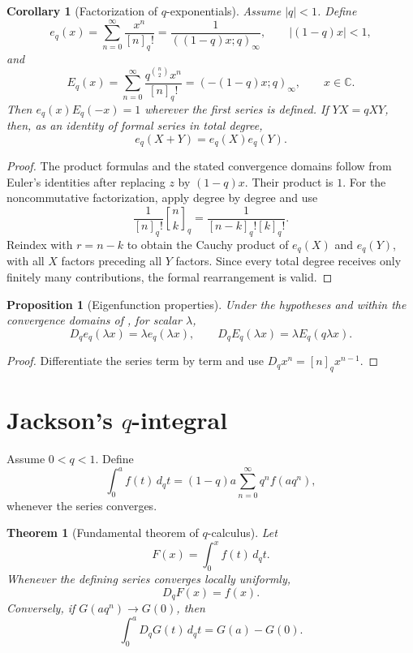 \documentclass[11pt,oneside,openany]{book}
\newtheorem{theorem}{Theorem}[chapter]
\newtheorem{proposition}[proposition]{Proposition}
\newtheorem{corollary}[corollary]{Corollary}
\theoremstyle{definition}
\theoremstyle{remark}
\newcommand{\qbinom}[2]{\genfrac{[}{]}{0pt}{}{#1}{#2}_{q}}
\newcommand{\C}{\mathbb C}
\newcommand{\abs}[1]{\lvert #1\rvert}
\begin{document}
\begin{corollary}[Factorization of $q$-exponentials]\label{cor:qexp-factor}
Assume $\abs q<1$.  Define
\[
 e_q(x)=\sum_{n=0}^{\infty}\frac{x^n}{[n]_q!}
 =\frac1{((1-q)x;q)_\infty},
 \qquad \abs{(1-q)x}<1,
\]
and
\[
 E_q(x)=\sum_{n=0}^{\infty}\frac{q^{\binom n2}x^n}{[n]_q!}
 =(-(1-q)x;q)_\infty,
 \qquad x\in\C.
\]
Then $e_q(x)E_q(-x)=1$ wherever the first series is defined.  If $YX=qXY$, then, as an identity of formal series in total degree,
\[
 e_q(X+Y)=e_q(X)e_q(Y).
\]
\end{corollary}

\begin{proof}
The product formulas and the stated convergence domains follow from Euler's identities after replacing $z$ by $(1-q)x$.  Their product is $1$.  For the noncommutative factorization, apply  degree by degree and use
\[
 \frac1{[n]_q!}\qbinom nk
 =\frac1{[n-k]_q![k]_q!}.
\]
Reindex with $r=n-k$ to obtain the Cauchy product of $e_q(X)$ and $e_q(Y)$, with all $X$ factors preceding all $Y$ factors.  Since every total degree receives only finitely many contributions, the formal rearrangement is valid.
\end{proof}

\begin{proposition}[Eigenfunction properties]\label{prop:qexp-eigen}
Under the hypotheses and within the convergence domains of , for scalar $\lambda$,
\[
 D_qe_q(\lambda x)=\lambda e_q(\lambda x),
 \qquad
 D_qE_q(\lambda x)=\lambda E_q(q\lambda x).
\]
\end{proposition}

\begin{proof}
Differentiate the series term by term and use $D_qx^n=[n]_qx^{n-1}$.
\end{proof}

\section{Jackson's \texorpdfstring{$q$}{q}-integral}

Assume $0<q<1$.  Define
\[
 \int_0^a f(t)\,d_qt
 =(1-q)a\sum_{n=0}^{\infty}q^nf(aq^n),
\]
whenever the series converges.

\begin{theorem}[Fundamental theorem of $q$-calculus]\label{thm:q-fundamental}
Let
\[
 F(x)=\int_0^x f(t)\,d_qt.
\]
Whenever the defining series converges locally uniformly,
\[
 D_qF(x)=f(x).
\]
Conversely, if $G(aq^n)\to G(0)$, then
\[
 \int_0^aD_qG(t)\,d_qt=G(a)-G(0).
\]
\end{theorem}
\end{document}
